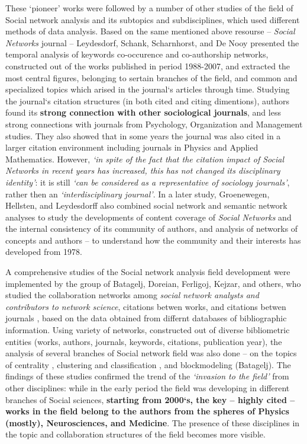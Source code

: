 \documentclass[11pt]{article} %
\begin{document}
These `pioneer' works were followed by a number of other studies of the field of Social network analysis and its subtopics and subdisciplines, which used different methods of data analysis. Based on the same mentioned above resourse -- \textit{Social Networks} journal -- Leydesdorf, Schank, Scharnhorst, and De Nooy \citep{leydes} presented the temporal analysis of keywords co-occurence and co-authorship networks, constructed out of the works published in period 1988-2007, and extracted the most central figures, belonging to sertain branches of the field, and common and specialized topics which arised in the journal`s articles through time. Studying the journal`s citation structures (in both cited and citing dimentions),  authors found its \textbf{strong connection with other sociological journals}, and less strong connections with journals from Psychology, Organization and Management studies. They also showed that in some years the journal was also cited in a larger citation environment including journals in Physics and Applied Mathematics. However, \textit{`in spite of the fact that the citation impact of Social Networks in recent years has increased, this has not changed its disciplinary identity'}: it is still \textit{`can be considered as a representative of sociology journals'}, rather then an \textit{`interdisciplinary journal'}. In a later study,  Groenewegen, Hellsten, and Leydesdorff \citep{lookingglass} also combined social network and semantic network analyses to study the developments of content coverage of \textit{Social Networks} and the internal consistency of its community of authors, and analysis of networks of concepts and authors -- to understand how the community and their interests has developed from 1978.   \medskip 

A comprehensive studies of the Social network analysis field development were implemented by the group of Batagelj, Doreian, Ferligoj, Kejzar, and others, who studied the collaboration networks among \textit{social network analysts and contributors to network science}, citations betwen works, and citations betwen journals \citep{Understand}, based on the data obtained from differnt databases of bibliographic information. Using variety of networks, constructed out of diverse bibliometric entities (works, authors, journals, keywords, citations, publication year), the analysis of several branches of Social network field was also done -- on the topics of centrality \citep{Understand}, clustering and classification \citep{kejzar}, and blockmodeling (Batagelj). The findings of these studies confirmed the trend of the \textit{`invasion to the field'} from other disciplines: while in the early period the field was developing in different branches of Social sciences, \textbf{starting from 2000`s, the key -- highly cited -- works in the field belong to the authors from the spheres of Physics (mostly), Neurosciences, and Medicine}. The presence of these disciplines in the topic and collaboration structures of the field becomes more visible. \medskip  
\end{document}
